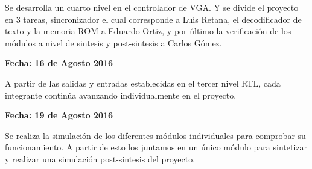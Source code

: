 \documentclass[12pt,a4paper]{report}
\begin{document}
Se desarrolla un cuarto nivel en el controlador de VGA. Y se divide el proyecto en 3 tareas, sincronizador el cual corresponde a Luis Retana, el decodificador de texto y la memoria ROM a Eduardo Ortiz, y por último la verificación de los módulos a nivel de sintesis y post-sintesis a Carlos Gómez.

\begin{flushright}
\begin{large}
\textbf{Fecha: 16 de Agosto 2016}\\
\end{large}
\end{flushright}

A partir de las salidas y entradas establecidas en el tercer nivel RTL, cada integrante continúa avanzando individualmente en el proyecto.

\begin{flushright}
\begin{large}
\textbf{Fecha: 19 de Agosto 2016}\\
\end{large}
\end{flushright}

Se realiza la simulación de los diferentes módulos individuales para comprobar su funcionamiento. A partir de esto los juntamos en un único módulo para sintetizar y realizar una simulación post-sintesis del proyecto.
\end{document}
